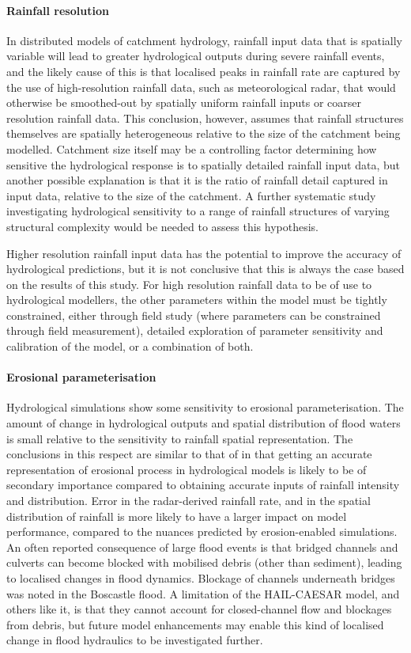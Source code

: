 \paragraph{Rainfall resolution}
In distributed models of catchment hydrology, rainfall input data that is spatially variable will lead to greater hydrological outputs during severe rainfall events, and the likely cause of this is that localised peaks in rainfall rate are captured by the use of high-resolution rainfall data, such as meteorological radar, that would otherwise be smoothed-out by spatially uniform rainfall inputs or coarser resolution rainfall data. This conclusion, however, assumes that rainfall structures themselves are spatially heterogeneous relative to the size of the catchment being modelled. Catchment size itself may be a controlling factor determining how sensitive the hydrological response is to spatially detailed rainfall input data, but another possible explanation is that it is the ratio of rainfall detail captured in input data, relative to the size of the catchment. A further systematic study investigating hydrological sensitivity to a range of rainfall structures of varying structural complexity would be needed to assess this hypothesis. 

Higher resolution rainfall input data has the potential to improve the accuracy of hydrological predictions, but it is not conclusive that this is always the case based on the results of this study. For high resolution rainfall data to be of use to hydrological modellers, the other parameters within the model must be tightly constrained, either through field study (where parameters can be constrained through field measurement), detailed exploration of parameter sensitivity and calibration of the model, or a combination of both. 

\paragraph{Erosional parameterisation}
Hydrological simulations show some sensitivity to erosional parameterisation. The amount of change in hydrological outputs and spatial distribution of flood waters is small relative to the sensitivity to rainfall spatial representation. The conclusions in this respect are similar to that of \citet{wong2015sensitivity} in that getting an accurate representation of erosional process in hydrological models is likely to be of secondary importance compared to obtaining accurate inputs of rainfall intensity and distribution. Error in the radar-derived rainfall rate, and in the spatial distribution of rainfall is more likely to have a larger impact on model performance, compared to the nuances predicted by erosion-enabled simulations. An often reported consequence of large flood events is that bridged channels and culverts can become blocked  with mobilised debris (other than sediment), leading to localised changes in flood dynamics. Blockage of channels underneath bridges was noted in the Boscastle flood. A limitation of the HAIL-CAESAR model, and others like it, is that they cannot account for closed-channel flow and blockages from debris, but future model enhancements may enable this kind of localised change in flood hydraulics to be investigated further.

